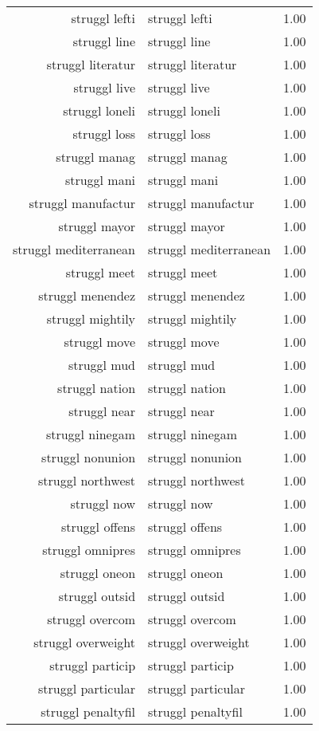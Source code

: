 \begin{table}[ht]
\begin{tabular}{rlr}
  struggl lefti & struggl lefti & 1.00 \\ 
  struggl line & struggl line & 1.00 \\ 
  struggl literatur & struggl literatur & 1.00 \\ 
  struggl live & struggl live & 1.00 \\ 
  struggl loneli & struggl loneli & 1.00 \\ 
  struggl loss & struggl loss & 1.00 \\ 
  struggl manag & struggl manag & 1.00 \\ 
  struggl mani & struggl mani & 1.00 \\ 
  struggl manufactur & struggl manufactur & 1.00 \\ 
  struggl mayor & struggl mayor & 1.00 \\ 
  struggl mediterranean & struggl mediterranean & 1.00 \\ 
  struggl meet & struggl meet & 1.00 \\ 
  struggl menendez & struggl menendez & 1.00 \\ 
  struggl mightily & struggl mightily & 1.00 \\ 
  struggl move & struggl move & 1.00 \\ 
  struggl mud & struggl mud & 1.00 \\ 
  struggl nation & struggl nation & 1.00 \\ 
  struggl near & struggl near & 1.00 \\ 
  struggl ninegam & struggl ninegam & 1.00 \\ 
  struggl nonunion & struggl nonunion & 1.00 \\ 
  struggl northwest & struggl northwest & 1.00 \\ 
  struggl now & struggl now & 1.00 \\ 
  struggl offens & struggl offens & 1.00 \\ 
  struggl omnipres & struggl omnipres & 1.00 \\ 
  struggl oneon & struggl oneon & 1.00 \\ 
  struggl outsid & struggl outsid & 1.00 \\ 
  struggl overcom & struggl overcom & 1.00 \\ 
  struggl overweight & struggl overweight & 1.00 \\ 
  struggl particip & struggl particip & 1.00 \\ 
  struggl particular & struggl particular & 1.00 \\ 
  struggl penaltyfil & struggl penaltyfil & 1.00 \\ 

\end{tabular}
\end{table}

